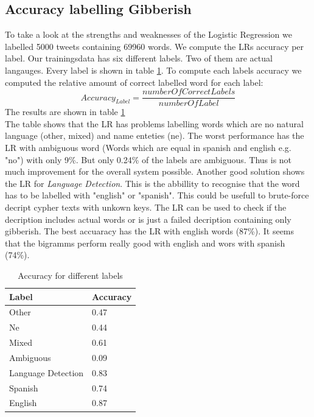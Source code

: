 \subsection{Accuracy labelling Gibberish}
To take a look at the strengths and weaknesses of the Logistic Regression we labelled 5000 tweets containing 69960 words. We compute the LRs accuracy per label. Our trainingsdata has six different labels. Two of them are actual langauges. Every label is shown in table \ref{tbl:accByLabel}. To compute each labels accuracy we computed the relative amount of correct labelled word for each label:
\[Accuracy_{Label} = \frac{numberOfCorrectLabels}{numberOfLabel}\] 
The results are shown in table \ref{tbl:accByLabel} \\
The table shows that the LR has problems labelling words which are no natural language (other, mixed) and name enteties (ne).  The worst performance has the LR with ambiguous word (Words which are equal in spanish and english e.g. "no") with only 9\%. But only 0.24\% of the labels are ambiguous. Thus is not much improvement for the overall system possible. 
Another good solution shows the LR for \textit{Language Detection}. This is the abbillity to recognise that the word has to be labelled with "english" or "spanish". This could be usefull to brute-force decript cypher texts with unkown keys. The LR can be used to check if the decription includes actual words or is just a failed decription containing only gibberish. The best accuaracy has the LR with english words (87\%). It seems that the bigramms perform really good with english and wors with spanish  (74\%).
\begin{table}[]
\centering
\label{tbl:accByLabel}
\begin{tabular}{ll}
Label& Accuracy \\ \hline
Other     & 0.47 \\
Ne        & 0.44 \\
Mixed     & 0.61 \\
Ambiguous & 0.09 \\
Language Detection & 0.83 \\
Spanish   & 0.74 \\
English   & 0.87 
\end{tabular}
\caption{Accuracy for different labels}
\end{table}


